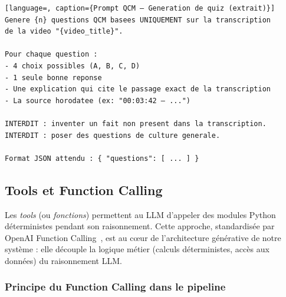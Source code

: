 \documentclass[12pt, a4paper]{article}
\begin{document}
\begin{lstlisting}[language=, caption={Prompt QCM — Generation de quiz (extrait)}]
Genere {n} questions QCM basees UNIQUEMENT sur la transcription
de la video "{video_title}".

Pour chaque question :
- 4 choix possibles (A, B, C, D)
- 1 seule bonne reponse
- Une explication qui cite le passage exact de la transcription
- La source horodatee (ex: "00:03:42 — ...")

INTERDIT : inventer un fait non present dans la transcription.
INTERDIT : poser des questions de culture generale.

Format JSON attendu : { "questions": [ ... ] }
\end{lstlisting}

\subsection{Tools et Function Calling}
\label{sec:tools}

Les \textit{tools} (ou \textit{fonctions}) permettent au LLM d'appeler des
modules Python déterministes pendant son raisonnement. Cette approche,
standardisée par OpenAI Function Calling~\cite{brown2020gpt3}, est au cœur
de l'architecture générative de notre système : elle découple la logique
métier (calculs déterministes, accès aux données) du raisonnement LLM.

\subsubsection{Principe du Function Calling dans le pipeline}

\begin{center}
\end{center}
\end{document}
